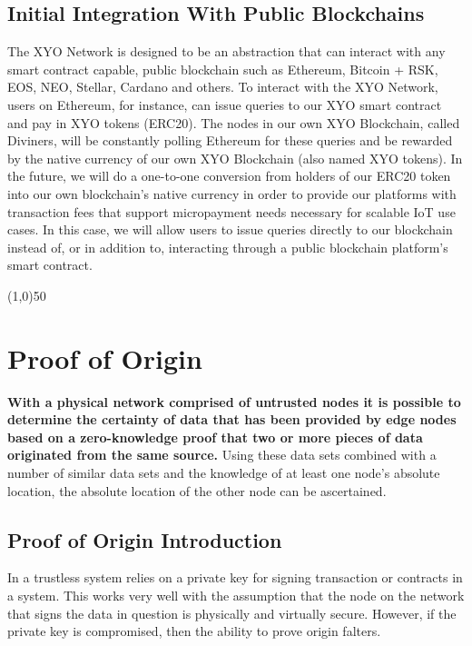 \documentclass{article}
\begin{document}
\subsection{Initial Integration With Public Blockchains}

The XYO Network is designed to be an abstraction that can interact with any smart contract capable, public blockchain such as Ethereum, Bitcoin + RSK, EOS, NEO, Stellar, Cardano and others. To interact with the XYO Network, users on Ethereum, for instance, can issue queries to our XYO smart contract and pay in XYO tokens (ERC20). The nodes in our own XYO Blockchain, called Diviners, will be constantly polling Ethereum for these queries and be rewarded by the native currency of our own XYO Blockchain (also named XYO tokens). In the future, we will do a one-to-one conversion from holders of our ERC20 token into our own blockchain's native currency in order to provide our platforms with transaction fees that support micropayment needs necessary for scalable IoT use cases. In this case, we will allow users to issue queries directly to our blockchain instead of, or in addition to, interacting through a public blockchain platform's smart contract.

\begin{center}
\line(1,0){50}
\end{center}

\section{Proof of Origin}
\textbf{With a physical network comprised of untrusted nodes it is possible to determine the certainty of data that has been provided by edge nodes based on a zero-knowledge proof that two or more pieces of data originated from the same source.} Using these data sets combined with a number of similar data sets and the knowledge of at least one node’s absolute location, the absolute location of the other node can be ascertained.

\subsection{Proof of Origin Introduction}

In a trustless system relies on a private key for signing transaction or contracts in a system. This works very well with the assumption that the node on the network that signs the data in question is physically and virtually secure. However, if the private key is compromised, then the ability to prove origin falters.
\end{document}
